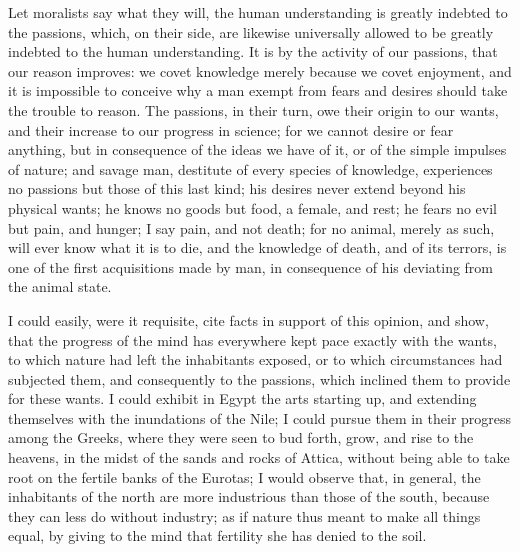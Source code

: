 \documentclass[11pt,twocolumn]{ltugboat}
\begin{document}
Let moralists say what they will, the human understanding is greatly
indebted to the passions, which, on their side, are likewise
universally allowed to be greatly indebted to the human understanding.
It is by the activity of our passions, that our reason improves: we
covet knowledge merely because we covet enjoyment, and it is
impossible to conceive why a man exempt from fears and desires should
take the trouble to reason. The passions, in their turn, owe their
origin to our wants, and their increase to our progress in science;
for we cannot desire or fear anything, but in consequence of the ideas
we have of it, or of the simple impulses of nature; and savage man,
destitute of every species of knowledge, experiences no passions but
those of this last kind; his desires never extend beyond his physical
wants; he knows no goods but food, a female, and rest; he fears no
evil but pain, and hunger; I say pain, and not death; for no animal,
merely as such, will ever know what it is to die, and the knowledge of
death, and of its terrors, is one of the first acquisitions made by
man, in consequence of his deviating from the animal state.

I could easily, were it requisite, cite facts in support of this
opinion, and show, that the progress of the mind has everywhere kept
pace exactly with the wants, to which nature had left the inhabitants
exposed, or to which circumstances had subjected them, and
consequently to the passions, which inclined them to provide for these
wants. I could exhibit in Egypt the arts starting up, and extending
themselves with the inundations of the Nile; I could pursue them in
their progress among the Greeks, where they were seen to bud forth,
grow, and rise to the heavens, in the midst of the sands and rocks of
Attica, without being able to take root on the fertile banks of the
Eurotas; I would observe that, in general, the inhabitants of the
north are more industrious than those of the south, because they can
less do without industry; as if nature thus meant to make all things
equal, by giving to the mind that fertility she has denied to the
soil.
\end{document}
